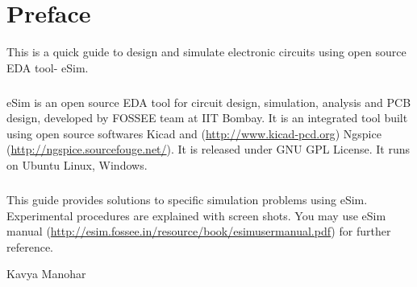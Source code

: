 \chapter*{Preface}

This is a quick guide to design and simulate electronic circuits using open source EDA tool- eSim. 
\paragraph{}

eSim is an open source EDA tool for circuit design, simulation, analysis and PCB design, developed by FOSSEE team at IIT Bombay. It is an integrated tool built using open source softwares Kicad and (\url{http://www.kicad-pcd.org}) Ngspice (\url{http://ngspice.sourcefouge.net/}). It is released under GNU GPL License. It runs on Ubuntu Linux, Windows.

\paragraph{}
This guide provides solutions to specific simulation problems using eSim. Experimental procedures are explained with screen shots. You may use eSim manual (\url{http://esim.fossee.in/resource/book/esimusermanual.pdf}) for further reference.


\begin{flushright} Kavya Manohar \end{flushright}

